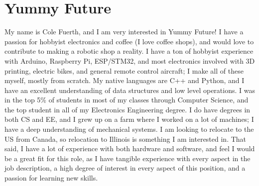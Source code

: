 \section{Yummy Future}

My name is Cole Fuerth, and I am very interested in Yummy Future! I have a passion for hobbyist electronics and coffee (I love coffee shops), and would love to contribute to making a robotic shop a reality. I have a ton of hobbyist experience with Arduino, Raspberry Pi, ESP/STM32, and most electronics involved with 3D printing, electric bikes, and general remote control aircraft; I make all of these myself, mostly from scratch. My native languages are C++ and Python, and I have an excellent understanding of data structures and low level operations. I was in the top 5\% of students in most of my classes through Computer Science, and the top student in all of my Electronics Engineering degree. I do have degrees in both CS and EE, and I grew up on a farm where I worked on a lot of machines; I have a deep understanding of mechanical systems. I am looking to relocate to the US from Canada, so relocation to Illinois is something I am interested in. That said, I have a lot of experience with both hardware and software, and feel I would be a great fit for this role, as I have tangible experience with every aspect in the job description, a high degree of interest in every aspect of this position, and a passion for learning new skills.
